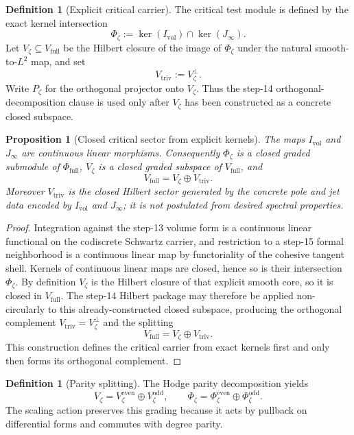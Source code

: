 \documentclass[11pt,a4paper]{article}
\theoremstyle{plain}
\newtheorem{proposition}[theorem]{Proposition}
\theoremstyle{definition}
\newtheorem{definition}[theorem]{Definition}
\newcommand{\triv}{\mathrm{triv}}
\begin{document}
\begin{definition}[Explicit critical carrier]
The critical test module is defined by the exact kernel intersection
\[
  \Phi_{\zeta}:=\ker(I_{\mathrm{vol}})\cap\ker(J_{\infty}).
\]
Let $V_{\zeta}\subseteq V_{\mathrm{full}}$ be the Hilbert closure of the image of $\Phi_{\zeta}$ under the natural smooth-to-$L^2$ map, and set
\[
  V_{\triv}:=V_{\zeta}^{\perp}.
\]
Write $P_{\zeta}$ for the orthogonal projector onto $V_{\zeta}$. Thus the step-14 orthogonal-decomposition clause is used only after $V_{\zeta}$ has been constructed as a concrete closed subspace.
\end{definition}

\begin{proposition}[Closed critical sector from explicit kernels]
\label{prop:critical-kernels}
The maps $I_{\mathrm{vol}}$ and $J_{\infty}$ are continuous linear morphisms. Consequently $\Phi_{\zeta}$ is a closed graded submodule of $\Phi_{\mathrm{full}}$, $V_{\zeta}$ is a closed graded subspace of $V_{\mathrm{full}}$, and
\[
  V_{\mathrm{full}}=V_{\zeta}\oplus V_{\triv}.
\]
Moreover $V_{\triv}$ is the closed Hilbert sector generated by the concrete pole and jet data encoded by $I_{\mathrm{vol}}$ and $J_{\infty}$; it is not postulated from desired spectral properties.
\end{proposition}

\begin{proof}
Integration against the step-13 volume form is a continuous linear functional on the codiscrete Schwartz carrier, and restriction to a step-15 formal neighborhood is a continuous linear map by functoriality of the cohesive tangent shell. Kernels of continuous linear maps are closed, hence so is their intersection $\Phi_{\zeta}$. By definition $V_{\zeta}$ is the Hilbert closure of that explicit smooth core, so it is closed in $V_{\mathrm{full}}$. The step-14 Hilbert package may therefore be applied non-circularly to this already-constructed closed subspace, producing the orthogonal complement $V_{\triv}=V_{\zeta}^{\perp}$ and the splitting
\[
  V_{\mathrm{full}}=V_{\zeta}\oplus V_{\triv}.
\]
This construction defines the critical carrier from exact kernels first and only then forms its orthogonal complement.
\end{proof}

\begin{definition}[Parity splitting]
The Hodge parity decomposition yields
\[
  V_{\zeta}=V_{\zeta}^{\mathrm{even}}\oplus V_{\zeta}^{\mathrm{odd}},
  \qquad
  \Phi_{\zeta}=\Phi_{\zeta}^{\mathrm{even}}\oplus \Phi_{\zeta}^{\mathrm{odd}}.
\]
The scaling action preserves this grading because it acts by pullback on differential forms and commutes with degree parity.
\end{definition}
\end{document}
